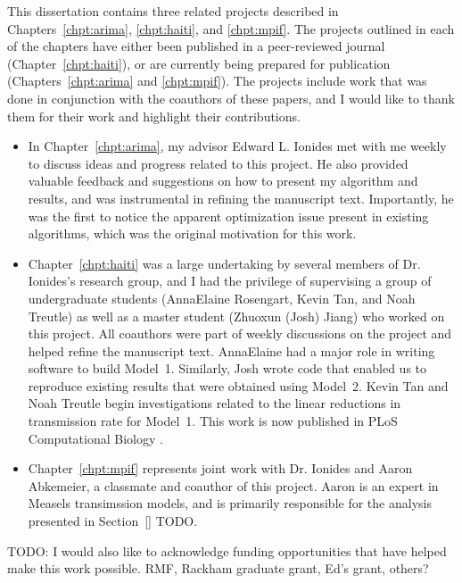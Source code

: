 This dissertation contains three related projects described in Chapters~\ref{chpt:arima}, \ref{chpt:haiti}, and \ref{chpt:mpif}.
The projects outlined in each of the chapters have either been published in a peer-reviewed journal (Chapter~\ref{chpt:haiti}), or are currently being prepared for publication (Chapters~\ref{chpt:arima} and \ref{chpt:mpif}). 
The projects include work that was done in conjunction with the coauthors of these papers, and I would like to thank them for their work and highlight their contributions.
\begin{itemize}
  \item  In Chapter~\ref{chpt:arima}, my advisor Edward L. Ionides met with me weekly to discuss ideas and progress related to this project.
  He also provided valuable feedback and suggestions on how to present my algorithm and results, and was instrumental in refining the manuscript text. 
  Importantly, he was the first to notice the apparent optimization issue present in existing algorithms, which was the original motivation for this work.
  \item Chapter~\ref{chpt:haiti} was a large undertaking by several members of Dr. Ionides's research group, and I had the privilege of supervising a group of undergraduate students (AnnaElaine Rosengart, Kevin Tan, and Noah Treutle) as well as a master student (Zhuoxun (Josh) Jiang) who worked on this project. 
  All coauthors were part of weekly discussions on the project and helped refine the manuscript text.
  AnnaElaine had a major role in writing software to build Model~1. 
  Similarly, Josh wrote code that enabled us to reproduce existing results that were obtained using Model~2.
  Kevin Tan and Noah Treutle begin investigations related to the linear reductions in transmission rate for Model~1.
  This work is now published in PLoS Computational Biology \citep{wheeler24}. 
  \item Chapter~\ref{chpt:mpif} represents joint work with Dr. Ionides and Aaron Abkemeier, a classmate and coauthor of this project. 
  Aaron is an expert in Measels transimssion models, and is primarily responsible for the analysis presented in Section~\ref{} TODO. 
\end{itemize}

TODO:  
I would also like to acknowledge funding opportunities that have helped make this work possible.
RMF, Rackham graduate grant, Ed's grant, others? 

